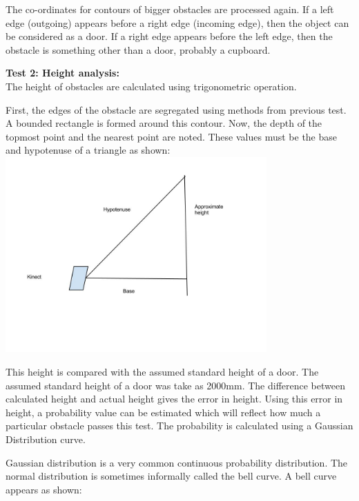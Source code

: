 \documentclass{report}
\begin{document}
The co-ordinates for contours of bigger obstacles are processed again. If a left edge (outgoing) 
appears before a right edge (incoming edge), then the object can be considered as a door. If a right 
edge appears  before the left edge, then the obstacle is something other than a door, probably a
cupboard.
\pagebreak

\textbf{Test 2: Height analysis:} \\
The height of obstacles are calculated using trigonometric operation.

First, the edges of the obstacle are segregated using methods from previous test. 
A bounded rectangle is formed around this contour. Now, the depth of the topmost point and the nearest 
point are noted. These values must be the base and hypotenuse of a triangle as shown: \\

\includegraphics[width = 10cm]{pythagoras.jpg}

This height is compared with the assumed standard height of a door. The assumed standard height of a door was take as 2000mm. 
The difference between calculated height and actual height gives the error in height. Using this error in height, 
a probability value can be estimated which will reflect how much a particular obstacle passes this test. 
The probability is calculated using a Gaussian Distribution curve. \\
\pagebreak

Gaussian distribution is a very common continuous probability distribution. The normal distribution is sometimes informally called the bell curve.
A bell curve appears as shown:\\
\end{document}
